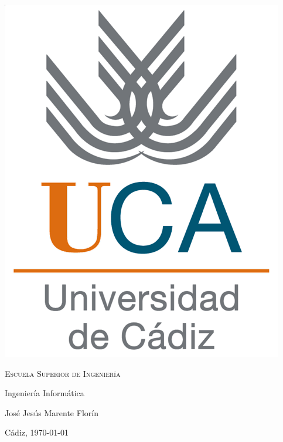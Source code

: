 \begin{titlepage}
  \centering
  \includegraphics[width=.3\textwidth]{0_inicio/logo_uca}

  \bigskip
  \bigskip
  \bigskip

  \begin{changemargin}{2em}{2em}
    \centering

    {\Huge \textsc{\nohyphens{Escuela Superior de Ingeniería}}}

    \bigskip
    \bigskip
    \bigskip

    {\huge \nohyphens{Ingeniería Informática}}

    \bigskip
    \bigskip
    \bigskip
    \bigskip
    \bigskip
    \bigskip

    \begin{doublespace}
      {\LARGE \nohyphens{\nombreProyecto}}
    \end{doublespace}


    \bigskip
    \bigskip
    \bigskip
    \bigskip

    \bigskip
    \bigskip
    \bigskip
    \bigskip
    \bigskip
    \bigskip
    \bigskip

  \end{changemargin}

  {\Large José Jesús Marente Florín\\}

  \bigskip

  {\large Cádiz, \today}

\end{titlepage}


